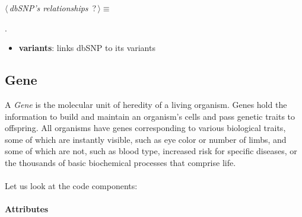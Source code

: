 	\begin{flushleft} \small
\begin{minipage}{\linewidth}\label{scrap5}\raggedright\small
{} $\langle\,${\itshape {dbSNP's relationships}}\nobreak\ {\footnotesize {?}}$\,\rangle\equiv$
\vspace{-1ex}
\begin{list}{}{} \item

                
        {\NWsep}
\end{list}
\vspace{-1.5ex}
\footnotesize
\begin{list}{}{\setlength{\itemsep}{-\parsep}\setlength{\itemindent}{-\leftmargin}}
\item {\NWtxtMacroNoRef}.

\item{}
\end{list}
\end{minipage}\vspace{4ex}
\end{flushleft}
\begin{itemize}
 	\item \textbf{variants}: links dbSNP to its variants
\end{itemize}


\subsection{Gene}
A \emph{Gene} is the molecular unit of heredity of a living organism. Genes hold the information to build and maintain an organism's cells and pass genetic traits to offspring. All organisms have genes corresponding to various biological traits, some of which are instantly visible, such as eye color or number of limbs, and some of which are not, such as blood type, increased risk for specific diseases, or the thousands of basic biochemical processes that comprise life.
\\
\\Let us look at the code components:

\paragraph{Attributes}      

